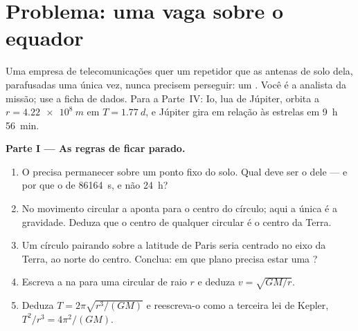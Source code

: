\section{Problema: uma vaga sobre o equador}

\begin{problem}
\label{pb:g12:satellites-kepler:1}
Uma empresa de telecomunicações quer um repetidor que as antenas de solo dela,
parafusadas uma única vez, nunca precisem perseguir: um  . Você
é a analista da missão; use a ficha de dados. Para a Parte~IV: Io, lua de Júpiter,
orbita a $r = \qty{4.22e8}{m}$ em $T = \qty{1.77}{d}$, e Júpiter gira em relação às
estrelas em \qty{9}{h} \qty{56}{min}.

\medskip
\noindent\textbf{Parte I --- As regras de ficar parado.}
\begin{enumerate}
  \item O  precisa permanecer sobre um ponto fixo do solo. Qual deve ser o
         dele --- e por que o  de \qty{86164}{s}, e não \qty{24}{h}?
  \item No movimento circular a  aponta para o centro do círculo; aqui
        a única  é a gravidade. Deduza que o centro de qualquer  circular é
        o centro da Terra.
  \item Um círculo pairando sobre a latitude de Paris seria centrado no eixo da Terra,
        ao norte do centro. Conclua: em que plano precisa estar uma ?
  \item Escreva a  na  para uma  circular de
        raio $r$ e deduza $v = \sqrt{GM/r}$.
  \item Deduza $T = 2\pi\sqrt{r^3/(GM)}$ e reescreva-o como a terceira lei de Kepler,
        $T^2/r^3 = 4\pi^2/(GM)$.
\end{enumerate}


\end{problem}
